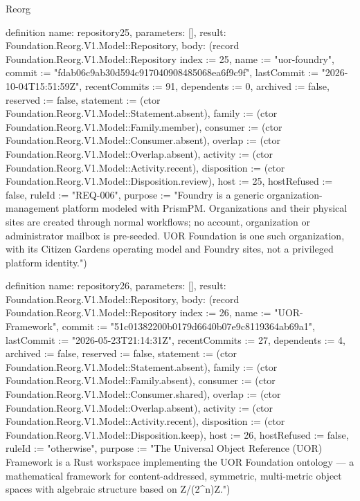 \begin{lexlean}{Reorg}
\begin{semanticmodule}
definition{
  name: repository25,
  parameters: [],
  result: Foundation.Reorg.V1.Model::Repository,
  body: (record Foundation.Reorg.V1.Model::Repository {index := 25, name := "uor-foundry", commit := "fdab06c9ab30d594c917040908485068ea6f9c9f", lastCommit := "2026-10-04T15:51:59Z", recentCommits := 91, dependents := 0, archived := false, reserved := false, statement := (ctor Foundation.Reorg.V1.Model::Statement.absent), family := (ctor Foundation.Reorg.V1.Model::Family.member), consumer := (ctor Foundation.Reorg.V1.Model::Consumer.absent), overlap := (ctor Foundation.Reorg.V1.Model::Overlap.absent), activity := (ctor Foundation.Reorg.V1.Model::Activity.recent), disposition := (ctor Foundation.Reorg.V1.Model::Disposition.review), host := 25, hostRefused := false, ruleId := "REQ-006", purpose := "Foundry is a generic organization-management platform modeled with PrismPM. Organizations and their physical sites are created through normal workflows; no account, organization or administrator mailbox is pre-seeded. UOR Foundation is one such organization, with its Citizen Gardens operating model and Foundry sites, not a privileged platform identity."})
}

definition{
  name: repository26,
  parameters: [],
  result: Foundation.Reorg.V1.Model::Repository,
  body: (record Foundation.Reorg.V1.Model::Repository {index := 26, name := "UOR-Framework", commit := "51c01382200b0179d6640b07e9c8119364ab69a1", lastCommit := "2026-05-23T21:14:31Z", recentCommits := 27, dependents := 4, archived := false, reserved := false, statement := (ctor Foundation.Reorg.V1.Model::Statement.absent), family := (ctor Foundation.Reorg.V1.Model::Family.absent), consumer := (ctor Foundation.Reorg.V1.Model::Consumer.shared), overlap := (ctor Foundation.Reorg.V1.Model::Overlap.absent), activity := (ctor Foundation.Reorg.V1.Model::Activity.recent), disposition := (ctor Foundation.Reorg.V1.Model::Disposition.keep), host := 26, hostRefused := false, ruleId := "otherwise", purpose := "The Universal Object Reference (UOR) Framework is a Rust workspace implementing the UOR Foundation ontology — a mathematical framework for content-addressed, symmetric, multi-metric object spaces with algebraic structure based on Z/(2^n)Z."})
}


\end{semanticmodule}
\end{lexlean}
